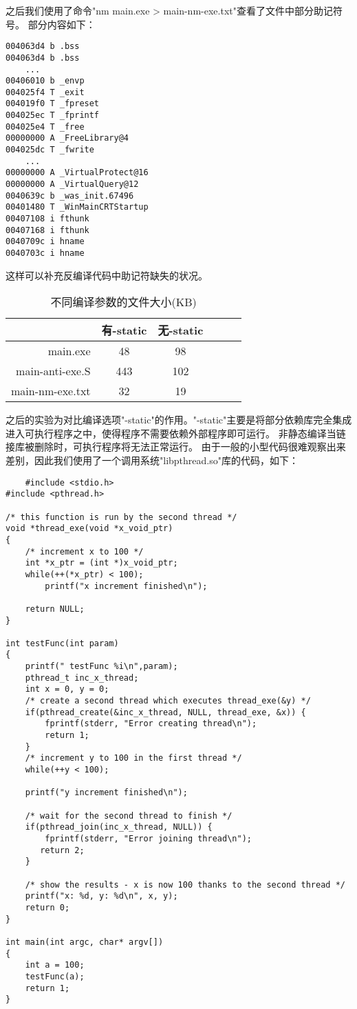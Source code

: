 \documentclass[UTF8]{ctexart}
\begin{document}
之后我们使用了命令"nm main.exe > main-nm-exe.txt"查看了文件中部分助记符号。
部分内容如下：
\begin{lstlisting}
004063d4 b .bss
004063d4 b .bss   
    ...
00406010 b _envp
004025f4 T _exit
004019f0 T _fpreset
004025ec T _fprintf
004025e4 T _free
00000000 A _FreeLibrary@4
004025dc T _fwrite
    ...
00000000 A _VirtualProtect@16
00000000 A _VirtualQuery@12
0040639c b _was_init.67496
00401480 T _WinMainCRTStartup
00407108 i fthunk
00407168 i fthunk
0040709c i hname
0040703c i hname
\end{lstlisting}
这样可以补充反编译代码中助记符缺失的状况。
\begin{table}
    \centering  
    \caption{不同编译参数的文件大小(KB)} 
    \label{table:ooo} 
    \begin{tabular}  
    {>{\columncolor{gray}}rccccc}  
    \toprule[1pt]  
    \rowcolor[gray]{0.9}    &有-static &无-static \\  
    \midrule  
    main.exe   &48   &98  \\  
    main-anti-exe.S &443 &102\\
    main-nm-exe.txt&32 &19\\
    \bottomrule[1pt]  
    \end{tabular}   
\end{table}  
之后的实验为对比编译选项"-static"的作用。"-static"主要是将部分依赖库完全集成进入可执行程序之中，使得程序不需要依赖外部程序即可运行。
非静态编译当链接库被删除时，可执行程序将无法正常运行。
由于一般的小型代码很难观察出来差别，因此我们使用了一个调用系统"libpthread.so"库的代码，如下：
\begin{lstlisting}
    #include <stdio.h>
#include <pthread.h>

/* this function is run by the second thread */
void *thread_exe(void *x_void_ptr)
{
    /* increment x to 100 */
    int *x_ptr = (int *)x_void_ptr;
    while(++(*x_ptr) < 100);
        printf("x increment finished\n");

    return NULL;
}

int testFunc(int param)
{
    printf(" testFunc %i\n",param);
    pthread_t inc_x_thread;
    int x = 0, y = 0;
    /* create a second thread which executes thread_exe(&y) */
    if(pthread_create(&inc_x_thread, NULL, thread_exe, &x)) {
        fprintf(stderr, "Error creating thread\n");
        return 1;
    }
    /* increment y to 100 in the first thread */
    while(++y < 100);

    printf("y increment finished\n");

    /* wait for the second thread to finish */
    if(pthread_join(inc_x_thread, NULL)) {
        fprintf(stderr, "Error joining thread\n");
       return 2;
    }

    /* show the results - x is now 100 thanks to the second thread */
    printf("x: %d, y: %d\n", x, y);
    return 0;
}

int main(int argc, char* argv[])
{
    int a = 100;
    testFunc(a);
    return 1;
}
\end{lstlisting}
\end{document}
